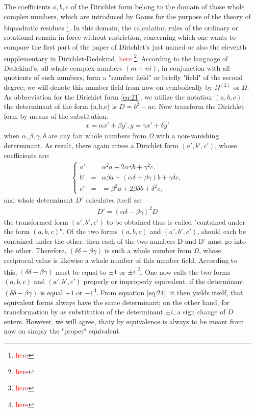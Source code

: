 The coefficients $a,b,c$ of the Dirichlet form belong to the domain of those whole complex numbers, which are introduced by Gauss for the purpose of the theory of biquadratic residues \footnote{\textcolor{red}{here}}.
In this domain, the calculation rules of the ordinary or rotational remain in force without restriction, concerning which one wants to compare the first part of the paper of Dirichlet's just named or also the eleventh supplementary in Dirichlet-Dedekind, \textcolor{red}{here} \footnote{\textcolor{red}{here}}.
According to the language of Dedekind's, all whole complex numbers $(m+ni)$, in conjunction with all quotients of such numbers, form a "number field" or briefly "field" of the second degree; we will denote this number field from now on symbolically by $\Omega^{(2)}$ or $\Omega$.
As abbreviation for the Dirichlet form \ref{eq:21}, we utilize the notation $(a,b,c)$; the determinant of the form (a,b,c) is $D=b^{2}-ac$.
Now transform the Dirichlet form by means of the substitution:
\begin{align}\label{eq:22}
x=\alpha x' + \beta y' , y=\gamma x' + \delta y'
\end{align}
when $\alpha, \beta, \gamma, \delta$ are any fair whole numbers from $\Omega$ with a non-vanishing determinant. As result, there again arises a Dirichlet form $(a',b',c')$, whose coefficients are:
\begin{align} \label{eq:23}
\left\{\begin{array}{rcl}
a'&=& \alpha^2 a+2\alpha\gamma b+\gamma^2 c,\\
b'&=&\alpha\beta a+(\alpha\delta+\beta\gamma)b+\gamma\delta c,\\
c'&=&=\beta^2 a+2\beta\delta b+\delta^2 c,
\end{array}\right.
\end{align}
and whole determinant $D'$ calculates itself as:
\begin{align}\label{eq:24}
D'=(\alpha\delta-\beta\gamma)^2 D
\end{align}
the transformed form $(a',b',c')$ to be obtained thus is called "contained under the form $(a,b,c)$".
Of the two forms $(a,b,c)$ and $(a',b',c')$, should each be contained under the other, then each of the two  numbers D and D' must go into the other. Therefore, $(\delta\delta-\beta\gamma)$ is such a whole number from $\Omega$, whose reciprocal value is likewise a whole number of this number field. According to this, $(\delta\delta-\beta\gamma)$ must be equal to $\pm 1$ or $\pm i$ \footnote{\textcolor{red}{here}}. One now calls the two forms $(a,b,c)$ and $(a',b',c')$ properly or improperly equivalent, if the determinant $(\delta\delta-\beta\gamma)$ is equal $+1$ or $-1$\footnote{\textcolor{red}{here}}. From equation \ref{eq:24}, it then yields itself, that equivalent forms always have the same determinant; on the other hand, for transformation by as substitution of the determinant $\pm i$, a sign change of $D$ enters. However, we will agree, thaty by equivalence is always to be meant from now on simply the "proper" equivalent.
